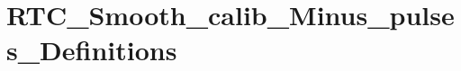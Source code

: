 \hypertarget{group___r_t_c___smooth__calib___minus__pulses___definitions}{\section{R\-T\-C\-\_\-\-Smooth\-\_\-calib\-\_\-\-Minus\-\_\-pulses\-\_\-\-Definitions}
\label{group___r_t_c___smooth__calib___minus__pulses___definitions}
}
